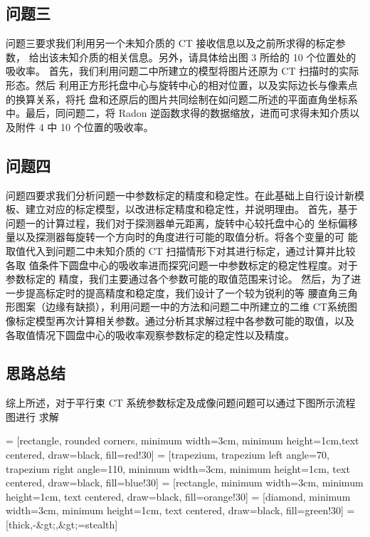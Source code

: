 \documentclass[bwprint]{cumcmthesis}
\begin{document}
\subsection{问题三}
问题三要求我们利用另一个未知介质的 CT 接收信息以及之前所求得的标定参数， 给出该未知介质的相关信息。另外，请具体给出图 3 所给的 10 个位置处的吸收率。 首先，我们利用问题二中所建立的模型将图片还原为 CT 扫描时的实际形态。然后 利用正方形托盘中心与旋转中心的相对位置，以及实际边长与像素点的换算关系，将托 盘和还原后的图片共同绘制在如问题二所述的平面直角坐标系中。最后，同问题二，将 Radon 逆函数求得的数据缩放，进而可求得未知介质以及附件 4 中 10 个位置的吸收率。

\subsection{问题四}
问题四要求我们分析问题一中参数标定的精度和稳定性。在此基础上自行设计新模 板、建立对应的标定模型，以改进标定精度和稳定性，并说明理由。 首先，基于问题一的计算过程，我们对于探测器单元距离，旋转中心较托盘中心的 坐标偏移量以及探测器每旋转一个方向时的角度进行可能的取值分析。将各个变量的可 能取值代入到问题二中未知介质的 CT 扫描情形下对其进行标定，通过计算并比较各取 值条件下圆盘中心的吸收率进而探究问题一中参数标定的稳定性程度。对于参数标定的 精度，我们主要通过各个参数可能的取值范围来讨论。 然后，为了进一步提高标定时的提高精度和稳定度，我们设计了一个较为锐利的等 腰直角三角形图案（边缘有缺损），利用问题一中的方法和问题二中所建立的二维 CT系统图像标定模型再次计算相关参数。通过分析其求解过程中各参数可能的取值，以及 各取值情况下圆盘中心的吸收率观察参数标定的稳定性以及精度。
\subsection{思路总结}
综上所述，对于平行束 CT 系统参数标定及成像问题问题可以通过下图所示流程图进行 求解



 = [rectangle, rounded corners, minimum width=3cm, minimum height=1cm,text centered, draw=black, fill=red!30]
 = [trapezium, trapezium left angle=70, trapezium right angle=110, minimum width=3cm, minimum height=1cm, text centered, draw=black, fill=blue!30]
 = [rectangle, minimum width=3cm, minimum height=1cm, text centered, draw=black, fill=orange!30]
 = [diamond, minimum width=3cm, minimum height=1cm, text centered, draw=black, fill=green!30]
 = [thick,-&gt;,&gt;=stealth]
 
\end{document}
